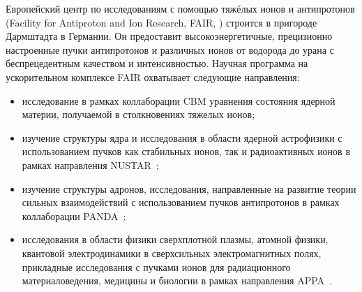 


Европейский центр по исследованиям с помощью тяжёлых ионов и антипротонов (Facility for Antiproton and Ion Research, FAIR, \cite{FAIR}) строится в пригороде Дармштадта в Германии.
Он предоставит высокоэнергетичные, прецизионно настроенные пучки антипротонов и различных ионов от водорода до урана с беспрецедентным качеством и интенсивностью.
Научная программа на ускорительном комплексе FAIR охватывает следующие направления:
\begin{itemize}
\item исследование в рамках коллаборации CBM уравнения состояния ядерной материи, получаемой в столкновениях тяжелых ионов;
\item изучение структуры ядра и исследования в области ядерной астрофизики с использованием пучков как стабильных ионов, так и радиоактивных ионов в рамках направления NUSTAR~\cite{NUSTAR};
\item изучение структуры адронов, исследования, направленные на развитие теории сильных взаимодействий с использованием пучков антипротонов в рамках коллаборации PANDA~\cite{PANDA};
\item исследования в области физики сверхплотной плазмы, атомной физики, квантовой электродинамики в сверхсильных электромагнитных полях, прикладные исследования с пучками ионов для радиационного материаловедения, медицины и биологии в рамках направления APPA~\cite{APPA}.
\end{itemize}


